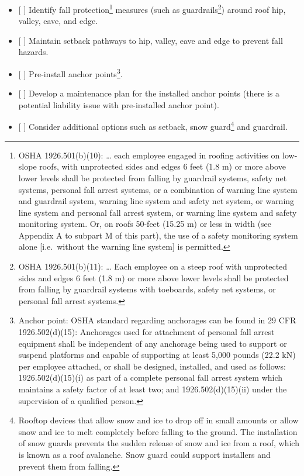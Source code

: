 \documentclass[]{article}
\providecommand{\tightlist}{%
  \setlength{\itemsep}{0pt}\setlength{\parskip}{0pt}}
\let\rmarkdownfootnote\footnote%
\def\footnote{\protect\rmarkdownfootnote}
\begin{document}
\begin{itemize}
\tightlist
\item
  {[} {]} Identify fall protection\footnote{OSHA 1926.501(b)(10):
    \ldots{} each employee engaged in roofing activities on low-slope
    roofs, with unprotected sides and edges 6 feet (1.8 m) or more above
    lower levels shall be protected from falling by guardrail systems,
    safety net systems, personal fall arrest systems, or a combination
    of warning line system and guardrail system, warning line system and
    safety net system, or warning line system and personal fall arrest
    system, or warning line system and safety monitoring system. Or, on
    roofs 50-feet (15.25 m) or less in width (see Appendix A to subpart
    M of this part), the use of a safety monitoring system alone
    {[}i.e.~without the warning line system{]} is permitted.} measures
  (such as guardrails\footnote{OSHA 1926.501(b)(11): \ldots{} Each
    employee on a steep roof with unprotected sides and edges 6 feet
    (1.8 m) or more above lower levels shall be protected from falling
    by guardrail systems with toeboards, safety net systems, or personal
    fall arrest systems.}) around roof hip, valley, eave, and edge.
\item
  {[} {]} Maintain setback pathways to hip, valley, eave and edge to
  prevent fall hazards.
\item
  {[} {]} Pre-install anchor points\footnote{Anchor point: OSHA standard
    regarding anchorages can be found in 29 CFR 1926.502(d)(15):
    Anchorages used for attachment of personal fall arrest equipment
    shall be independent of any anchorage being used to support or
    suspend platforms and capable of supporting at least 5,000 pounds
    (22.2 kN) per employee attached, or shall be designed, installed,
    and used as follows: 1926.502(d)(15)(i) as part of a complete
    personal fall arrest system which maintains a safety factor of at
    least two; and 1926.502(d)(15)(ii) under the supervision of a
    qualified person.}.
\item
  {[} {]} Develop a maintenance plan for the installed anchor points
  (there is a potential liability issue with pre-installed anchor
  point).
\item
  {[} {]} Consider additional options such as setback, snow
  guard\footnote{Rooftop devices that allow snow and ice to drop off in
    small amounts or allow snow and ice to melt completely before
    falling to the ground. The installation of snow guards prevents the
    sudden release of snow and ice from a roof, which is known as a roof
    avalanche. Snow guard could support installers and prevent them from
    falling.} and guardrail.
\end{itemize}
\end{document}
